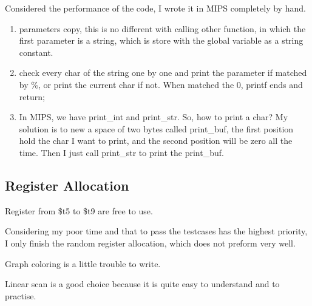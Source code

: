 \documentclass[preprint, 9pt]{sigplanconf}
\begin{document}
    Considered the performance of the code, I wrote it in MIPS completely by hand.
    \begin{enumerate}
        \item parameters copy, this is no different with calling other function, in which the first parameter is a string, which is store with the global variable as a string constant.
        \item check every char of the string one by one and print the parameter if matched by \%, or print the current char if not.
            When matched the 0, printf ends and return;
        \item In MIPS, we have print\_int and print\_str.
            So, how to print a char?
            My solution is to new a space of two bytes called print\_buf, the first position hold the char I want to print, and the second position will be zero all the time.
            Then I just call print\_str to print the print\_buf.
    \end{enumerate}

    \subsection{Register Allocation}

    Register from \$t5 to \$t9 are free to use.

     Considering my poor time and that to pass the testcases has the highest priority, I only finish the random register allocation, which does not preform very well.

    Graph coloring is a little trouble to write.

    Linear scan is a good choice because it is quite easy to understand and to practise.
\end{document}
